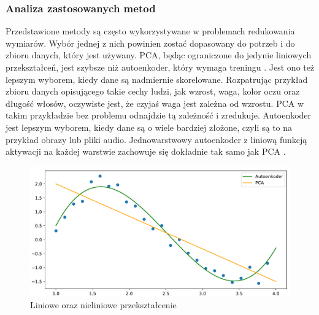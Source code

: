 \documentclass[a4paper,12pt,oneside]{book} %
\begin{document}
\subsubsection{Analiza zastosowanych metod}
Przedstawione metody są często wykorzystywane w problemach redukowania wymiarów. Wybór jednej z nich powinien zostać dopasowany do potrzeb i do zbioru danych, który jest używany. PCA, będąc ograniczone do jedynie liniowych przekształceń, jest szybsze niż autoenkoder, który wymaga treningu \cite{aevspca2}. Jest ono też lepszym wyborem, kiedy dane są nadmiernie skorelowane. Rozpatrując przykład zbioru danych opisującego takie cechy ludzi, jak wzrost, waga, kolor oczu oraz długość włosów, oczywiste jest, że czyjaś waga jest zależna od wzrostu. PCA w takim przykładzie bez problemu odnajdzie tą zależność i zredukuje. Autoenkoder jest lepszym wyborem, kiedy dane są o wiele bardziej złożone, czyli są to na przykład obrazy lub pliki audio.  
Jednowarstwowy autoenkoder z liniową funkcją aktywacji na każdej warstwie zachowuje się dokładnie tak samo jak PCA \cite{aevspca}.
\begin{figure}[h!]
	\centering
	\includegraphics[width=14cm]{pcavsautoencoder.pdf}
	\caption{Liniowe oraz nieliniowe przekształcenie}
	\label{fig:pcavsautoenkoder}
\end{figure}
\end{document}
